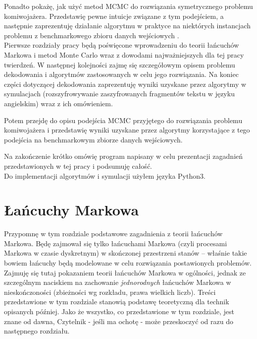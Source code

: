 \documentclass[a4paper]{article}
\theoremstyle{defn}
\theoremstyle{theorem}
\theoremstyle{lemma}
\theoremstyle{cor}
\theoremstyle{fact}
\begin{document}
Ponadto pokażę, jak użyć metod MCMC do rozwiązania symetrycznego problemu komiwojażera. Przedstawię pewne intuicje związane z tym podejściem, a następnie zaprezentuję działanie algorytmu w praktyce na niektórych instancjach problemu z benchmarkowego zbioru danych wejściowych \cite{benchmark}.
\\

Pierwsze rozdziały pracy będą poświęcone wprowadzeniu do teorii łańcuchów Markowa i metod Monte Carlo wraz z dowodami najważniejszych dla tej pracy twierdzeń. W następnej kolejności zajmę się szczegółowym opisem problemu dekodowania i algorytmów zastosowanych w celu jego rozwiązania. Na koniec części dotyczącej dekodowania zaprezentuję wyniki uzyskane przez algorytmy w symulacjach (rozszyfrowywanie zaszyfrowanych fragmentów tekstu w języku angielskim) wraz z ich omówieniem.

Potem przejdę do opisu podejścia MCMC przyjętego do rozwiązania problemu komiwojażera i przedstawię wyniki uzyskane przez algorytmy korzystające z tego podejścia na benchmarkowym zbiorze danych wejściowych.

Na zakończenie krótko omówię program napisany w celu prezentacji zagadnień przedstawionych w tej pracy i podsumuję całość.
\\

Do implementacji algorytmów i symulacji użyłem języka Python3.

\newpage

\section{Łańcuchy Markowa}
\label{sect2}
Przypomnę w tym rozdziale podstawowe zagadnienia z teorii łańcuchów Markowa. Będę zajmował się tylko łańcuchami Markowa (czyli procesami Markowa w czasie dyskretnym) w skończonej przestrzeni stanów – właśnie takie bowiem łańcuchy będą modelowane w celu rozwiązania postawionych problemów. Zajmuję się tutaj pokazaniem teorii łańcuchów Markowa w ogólności, jednak ze szczególnym naciskiem na zachowanie \textit{jednorodnych} łańcuchów Markowa w nieskończoności (zbieżności wg rozkładu, prawa wielkich liczb). Treści przedstawione w tym rozdziale stanowią podstawę teoretyczną dla technik opisanych później. Jako że wszystko, co przedstawione w tym rozdziale, jest znane od dawna, Czytelnik - jeśli ma ochotę - może przeskoczyć od razu do następnego rozdziału.
\end{document}

